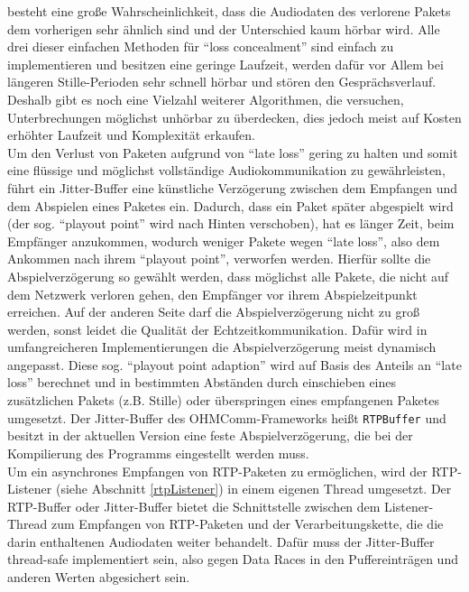 besteht eine große Wahrscheinlichkeit, dass die Audiodaten des verlorene Pakets dem vorherigen sehr ähnlich sind und der Unterschied kaum hörbar wird. Alle drei dieser einfachen Methoden für \enquote{loss concealment} sind einfach zu implementieren und besitzen eine geringe Laufzeit, werden dafür vor Allem bei längeren Stille-Perioden sehr schnell hörbar und stören den Gesprächsverlauf. Deshalb gibt es noch eine Vielzahl weiterer Algorithmen, die versuchen, Unterbrechungen möglichst unhörbar zu überdecken, dies jedoch meist auf Kosten erhöhter Laufzeit und Komplexität erkaufen.
\\
Um den Verlust von Paketen aufgrund von \enquote{late loss} gering zu halten und somit eine flüssige und möglichst vollständige Audiokommunikation zu gewährleisten, führt ein Jitter-Buffer eine künstliche Verzögerung zwischen dem Empfangen und dem Abspielen eines Paketes ein. Dadurch, dass ein Paket später abgespielt wird (der sog. \enquote{playout point} wird nach Hinten verschoben), hat es länger Zeit, beim Empfänger anzukommen, wodurch weniger Pakete wegen \enquote{late loss}, also dem Ankommen nach ihrem \enquote{playout point}, verworfen werden. Hierfür sollte die Abspielverzögerung so gewählt werden, dass möglichst alle Pakete, die nicht auf dem Netzwerk verloren gehen, den Empfänger vor ihrem Abspielzeitpunkt erreichen. Auf der anderen Seite darf die Abspielverzögerung nicht zu groß werden, sonst leidet die Qualität der Echtzeitkommunikation. Dafür wird in umfangreicheren Implementierungen die Abspielverzögerung meist dynamisch angepasst. Diese sog. \enquote{playout point adaption} wird auf Basis des Anteils an \enquote{late loss} berechnet und in bestimmten Abständen durch einschieben eines zusätzlichen Pakets (z.B. Stille) oder überspringen eines empfangenen Paketes umgesetzt. Der Jitter-Buffer des OHMComm-Frameworks heißt \texttt{RTPBuffer} und besitzt in der aktuellen Version eine feste Abspielverzögerung, die bei der Kompilierung des Programms eingestellt werden muss.
\\
Um ein asynchrones Empfangen von RTP-Paketen zu ermöglichen, wird der RTP-Listener (siehe Abschnitt \ref{rtpListener}) in einem eigenen Thread umgesetzt. Der RTP-Buffer oder Jitter-Buffer bietet die Schnittstelle zwischen dem Listener-Thread zum Empfangen von RTP-Paketen und der Verarbeitungskette, die die darin enthaltenen Audiodaten weiter behandelt. Dafür muss der Jitter-Buffer thread-safe implementiert sein, also gegen Data Races in den Puffereinträgen und anderen Werten abgesichert sein.
\\
